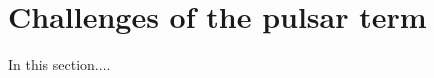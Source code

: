 \documentclass[fleqn,usenatbib,useAMS]{mnras}
\begin{document}
%
%
%



\section{Challenges of the pulsar term}\label{sec:psr_term_challenges}
In this section....
\end{document}

